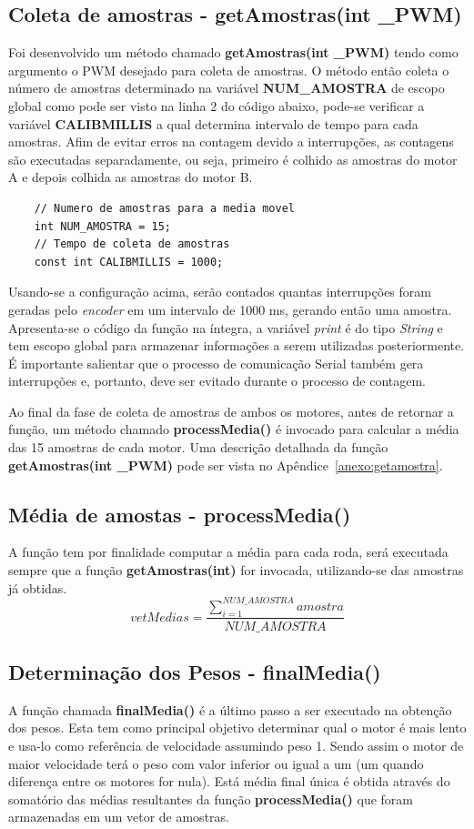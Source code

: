 \documentclass[a4paper,12pt,portuguese]{ufms-cpcx}
\begin{document}
\subsection{Coleta de amostras - getAmostras(int \_PWM)}\label{getamostras}
Foi desenvolvido um método chamado \textbf{getAmostras(int \_PWM)} tendo como argumento o PWM desejado para coleta de amostras.
O método então coleta o número de amostras determinado na variável \textbf{NUM\_AMOSTRA} de escopo global como pode ser visto na linha 2 do código abaixo, pode-se verificar a variável \textbf{CALIBMILLIS} a qual determina intervalo de tempo para cada amostras. Afim de evitar erros na contagem devido a interrupções, as contagens são executadas separadamente, ou seja, primeiro é colhido as amostras do motor A e depois colhida as amostras do motor B.

\begin{lstlisting}
	// Numero de amostras para a media movel
	int NUM_AMOSTRA = 15;
	// Tempo de coleta de amostras
	const int CALIBMILLIS = 1000;
\end{lstlisting}

Usando-se a configuração acima, serão contados quantas interrupções foram geradas pelo \textit{encoder} em um intervalo de 1000 ms, gerando então uma amostra. 
Apresenta-se o código da função na íntegra, a variável \textit{print} é do tipo \textit{String} e tem escopo global para armazenar informações a serem utilizadas posteriormente. 
É importante salientar que o processo de comunicação Serial também gera interrupções e, portanto, deve ser evitado durante o processo de contagem.

Ao final da fase de coleta de amostras de ambos os motores, antes de retornar a função, um método chamado \textbf{processMedia()} é invocado para calcular a média das 15 amostras de cada motor. Uma descrição detalhada da função \textbf{getAmostras(int \_PWM)} pode ser vista no Apêndice~\ref{anexo:getamostra}.

\subsection{Média de amostas - processMedia()}\label{processmedia}
A função tem por finalidade computar a média para cada roda, será executada sempre que a função \textbf{getAmostras(int)} for invocada, utilizando-se das amostras já obtidas.
\[ vetMedias = \dfrac{\sum_{i=1}^{NUM\_AMOSTRA}amostra}{NUM\_AMOSTRA}   \]

\subsection{Determinação dos Pesos - finalMedia()}\label{finalMedia}
A função chamada \textbf{finalMedia()} é a último passo a ser executado na obtenção dos pesos. Esta tem como principal objetivo determinar qual o motor é mais lento e usa-lo como referência de velocidade assumindo peso 1. Sendo assim o motor de maior velocidade terá o peso com valor inferior ou igual a um (um quando diferença entre os motores for nula). Está média final única é obtida através do somatório das médias resultantes da função \textbf{processMedia()} que foram armazenadas em um vetor de amostras.
\end{document}
